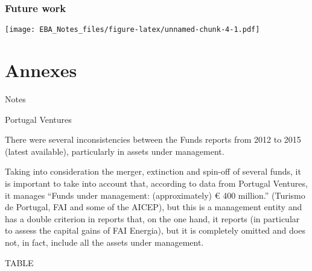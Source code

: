 \documentclass[]{book}
\newcommand{\euro}{€}
\theoremstyle{definition}
\theoremstyle{definition}
\theoremstyle{definition}
\theoremstyle{remark}
\begin{document}
\subsection{Future work}\label{future-work}

\texttt{[image: EBA\_Notes\_files/figure-latex/unnamed-chunk-4-1.pdf]}

\chapter{Annexes}\label{annexes}

Notes

Portugal Ventures

There were several inconsistencies between the Funds reports from 2012
to 2015 (latest available), particularly in assets under management.

Taking into consideration the merger, extinction and spin-off of several
funds, it is important to take into account that, according to data from
Portugal Ventures, it manages ``Funds under management: (approximately)
\euro{} 400 million.'' (Turismo de Portugal, FAI and some of the AICEP),
but this is a management entity and has a double criterion in reports
that, on the one hand, it reports (in particular to assess the capital
gains of FAI Energia), but it is completely omitted and does not, in
fact, include all the assets under management.

TABLE
\end{document}
